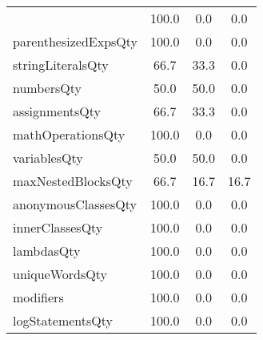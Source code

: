 \begin{tabular}{lccc}
{tryCatchQty & 100.0 & 0.0 & 0.0 \\
parenthesizedExpsQty & 100.0 & 0.0 & 0.0 \\
stringLiteralsQty & 66.7 & 33.3 & 0.0 \\
numbersQty & 50.0 & 50.0 & 0.0 \\
assignmentsQty & 66.7 & 33.3 & 0.0 \\
mathOperationsQty & 100.0 & 0.0 & 0.0 \\
variablesQty & 50.0 & 50.0 & 0.0 \\
maxNestedBlocksQty & 66.7 & 16.7 & 16.7 \\
anonymousClassesQty & 100.0 & 0.0 & 0.0 \\
innerClassesQty & 100.0 & 0.0 & 0.0 \\
lambdasQty & 100.0 & 0.0 & 0.0 \\
uniqueWordsQty & 100.0 & 0.0 & 0.0 \\
modifiers & 100.0 & 0.0 & 0.0 \\
logStatementsQty & 100.0 & 0.0 & 0.0 \\
\bottomrule
              \end{tabular}
            